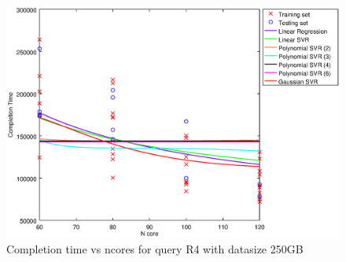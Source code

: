 
\begin {figure}[hbtp]
\centering
\includegraphics[width=\textwidth]{output/R4_250_1_OVER_NCORES/plot_R4_250.eps}
\caption{Completion time vs ncores for query R4 with datasize 250GB}
\label{fig:all_nonlinear_R4_250}
\end {figure}
